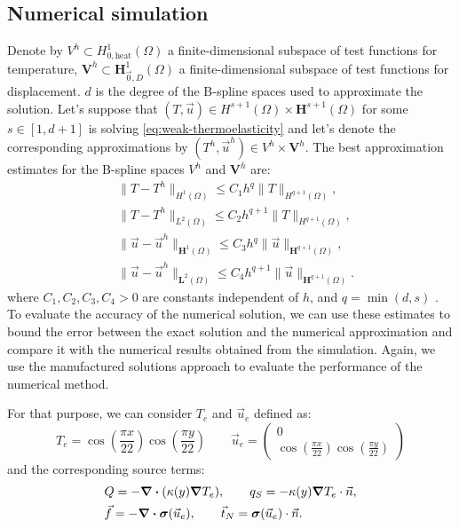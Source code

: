 \documentclass[a4paper,12pt,twoside]{report}
\begin{document}
\subsection{Numerical simulation}
Denote by $V^h \subset H^1_{0,\text{heat}}(\Omega)$ a finite-dimensional subspace of test functions for temperature, $\boldsymbol{V}^h \subset \boldsymbol{H}^1_{\vec 0,D}(\Omega)$ a finite-dimensional subspace of test functions for displacement. $d$ is the degree of the B-spline spaces used to approximate the solution. Let's suppose that $(T,\vec u) \in H^{s+1}(\Omega) \times \boldsymbol{H}^{s+1}(\Omega)$ for some $s \in [1, d+1]$ is solving \eqref{eq:weak-thermoelasticity} and let's denote the corresponding approximations by $(T^h,\vec u^h) \in V^h \times \boldsymbol{V}^h$. The best approximation estimates for the B-spline spaces $V^h$ and $\boldsymbol{V}^h$ are: 
\begin{equation}
	\begin{aligned}
		& \|T - T^h\|_{H^1(\Omega)} \leq C_1 h^q \|T\|_{H^{q+1}(\Omega)}, \\
		& \|T - T^h\|_{L^2(\Omega)} \leq C_2 h^{q+1} \|T\|_{H^{q+1}(\Omega)}, \\
		& \|\vec u - \vec u^h\|_{\boldsymbol H^1(\Omega)} \leq C_3 h^q \|\vec u\|_{\boldsymbol H^{q+1}(\Omega)}, \\
		& \|\vec u - \vec u^h\|_{\boldsymbol L^2(\Omega)} \leq C_4 h^{q+1} \|\vec u\|_{\boldsymbol H^{q+1}(\Omega)}.
	\end{aligned}
	\label{eq:approximation-estimates}
\end{equation}
where $C_1, C_2, C_3, C_4 > 0$ are constants independent of $h$, and $q = \min(d, s)$ \cite{da_veiga_mathematical_2014}.
To evaluate the accuracy of the numerical solution, we can use these estimates to bound the error between the exact solution and the numerical approximation and compare it with the numerical results obtained from the simulation. Again, we use the manufactured solutions approach to evaluate the performance of the numerical method.

For that purpose, we can consider $T_e$ and $\vec u_e$ defined as: 
$$
T_e = \cos\left(\frac{\pi x}{22}\right) \cos\left(\frac{\pi y}{22}\right) \qquad \vec u_e = \begin{pmatrix}
	0 \\
	\cos\left(\frac{\pi x}{22}\right) \cos\left(\frac{\pi y}{22}\right) 
\end{pmatrix}
$$
and the corresponding source terms:
\begin{equation*}
	\begin{aligned}
	& Q = - \div(\kappa(y) \grad T_e), \qquad q_S = -\kappa(y) \grad T_e \cdot \vec n, \\
	& \vec f = -\div \boldsymbol{\sigma}(\vec u_e), \qquad \vec t_N = \boldsymbol{\sigma}(\vec u_e) \cdot \vec n.
\end{aligned}
\end{equation*}
\end{document}
